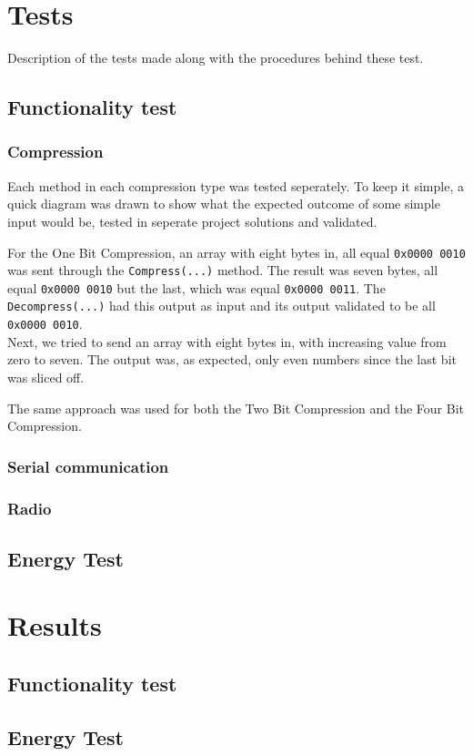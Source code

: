 \section{Tests}
Description of the tests made along with the procedures behind these test.

\subsection{Functionality test}

\subsubsection{Compression}
Each method in each compression type was tested seperately.
To keep it simple, a quick diagram was drawn to show what the expected outcome of some simple input would be, tested in seperate project solutions and validated.

For the One Bit Compression, an array with eight bytes in, all equal \texttt{0x0000 0010} was sent through the \texttt{Compress(...)} method.
The result was seven bytes, all equal \texttt{0x0000 0010} but the last, which was equal \texttt{0x0000 0011}.
The \texttt{Decompress(...)} had this output as input and its output validated to be all \texttt{0x0000 0010}.
\\
Next, we tried to send an array with eight bytes in, with increasing value from zero to seven. 
The output was, as expected, only even numbers since the last bit was sliced off.

The same approach was used for both the Two Bit Compression and the Four Bit Compression.

\subsubsection{Serial communication}

\subsubsection{Radio}


\subsection{Energy Test}

\section{Results}

\subsection{Functionality test}

\subsection{Energy Test}